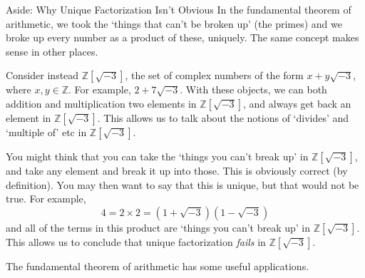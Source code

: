 \documentclass[a4paper]{scrartcl}
\begin{document}
\begin{aside}{Aside: Why Unique Factorization Isn't Obvious}
	In the fundamental theorem of arithmetic, we took the `things that can't be broken up' (the primes) and we broke up every number as a product of these, uniquely. The same concept makes sense in other places.

Consider instead $\mathbb{Z}[\sqrt{-3}]$, the set of complex numbers of the form $x + y\sqrt{-3}$, where $x, y \in \mathbb{Z}$. For example, $2 + 7\sqrt{-3}$. With these objects, we can both addition and multiplication two elements in $\mathbb{Z}[\sqrt{-3}]$, and always get back an element in $\mathbb{Z}[\sqrt{-3}]$. This allows us to talk about the notions of `divides' and `multiple of' etc in $\mathbb{Z}[\sqrt{-3}]$. 

You might think that you can take the `things you can't break up' in $\mathbb{Z}[\sqrt{-3}]$, and take any element and break it up into those. This is obviously correct (by definition). You may then want to say 
that this is unique, but that would not be true. For example,
$$
4 = 2 \times 2 = (1 + \sqrt{-3})(1 - \sqrt{-3})
$$
and all of the terms in this product are `things you can't break up' in $\mathbb{Z}[\sqrt{-3}]$. This allows us to conclude that unique factorization \emph{fails} in $\mathbb{Z}[\sqrt{-3}]$.

\end{aside}

The fundamental theorem of arithmetic has some useful applications.
\end{document}
